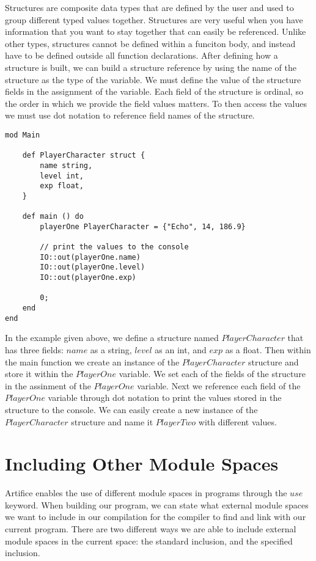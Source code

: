 \documentclass{article}
\begin{document}
Structures are composite data types that are defined by the user and used to group different typed values together. Structures are very useful when you have information
that you want to stay together that can easily be referenced. Unlike other types, structures cannot be defined within a funciton body, and instead have to be defined outside all
function declarations. After defining how a structure is built, we can build a structure reference by using the name of the structure as the type of the variable. We must
define the value of the structure fields in the assignment of the variable. Each field of the structure is ordinal, so the order in which we provide
the field values matters. To then access the values we must use dot notation to reference field names of the structure.

\begin{lstlisting}
mod Main

	def PlayerCharacter struct {
		name string,
		level int,
		exp float,
	}

	def main () do
		playerOne PlayerCharacter = {"Echo", 14, 186.9}

		// print the values to the console
		IO::out(playerOne.name)
		IO::out(playerOne.level)
		IO::out(playerOne.exp)

		0;
	end
end
\end{lstlisting}

In the example given above, we define a structure named $PlayerCharacter$ that has three fields: $name$ as a string, $level$ as an int, and $exp$
as a float. Then within the main function we create an instance of the $PlayerCharacter$ structure and store it within the $PlayerOne$ variable.
We set each of the fields of the structure in the assinment of the $PlayerOne$ variable. Next we reference each field of the $PlayerOne$ variable
through dot notation to print the values stored in the structure to the console. We can easily create a new instance of the $PlayerCharacter$ structure
and name it $PlayerTwo$ with different values.


\section{Including Other Module Spaces}

Artifice enables the use of different module spaces in programs through the $use$ keyword. When building our program, we can state what external module spaces we want to include in
our compilation for the compiler to find and link with our current program. There are two different ways we are able to include external module spaces in the current space: the
standard inclusion, and the specified inclusion.
\end{document}
